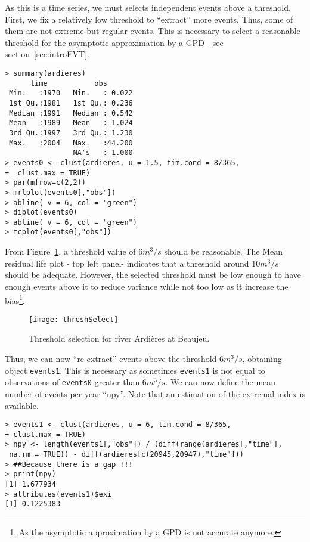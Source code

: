 \documentclass[11pt,a4paper]{article}
\numberwithin{equation}{section}
\theoremstyle{definition}
\begin{document}
As this is a time series, we must selects independent events above a
threshold. First, we fix a relatively low threshold to ``extract''
more events. Thus, some of them are not extreme but regular
events. This is necessary to select a reasonable threshold for the
asymptotic approximation by a GPD - see section~\ref{sec:introEVT}.
\begin{verbatim}
> summary(ardieres)
      time           obs        
 Min.   :1970   Min.   : 0.022  
 1st Qu.:1981   1st Qu.: 0.236  
 Median :1991   Median : 0.542  
 Mean   :1989   Mean   : 1.024  
 3rd Qu.:1997   3rd Qu.: 1.230  
 Max.   :2004   Max.   :44.200  
                NA's   : 1.000  
> events0 <- clust(ardieres, u = 1.5, tim.cond = 8/365,
+  clust.max = TRUE)
> par(mfrow=c(2,2))
> mrlplot(events0[,"obs"])
> abline( v = 6, col = "green")
> diplot(events0)
> abline( v = 6, col = "green")
> tcplot(events0[,"obs"])
\end{verbatim}
From Figure~\ref{fig:threshSelect}, a threshold value of $6 m^3/s$
should be reasonable. The Mean residual life plot - top left panel-
indicates that a threshold around $10 m^3/s$ should be
adequate. However, the selected threshold must be low enough to have
enough events above it to reduce variance while not too low as it
increase the bias\footnote{As the asymptotic approximation by a GPD is
  not accurate anymore.}.

\begin{figure}
  \centering
  \texttt{[image: threshSelect]}
  \caption{Threshold selection for river Ardi\`eres at Beaujeu.}
  \label{fig:threshSelect}
\end{figure}

Thus, we can now ``re-extract'' events above the threshold $6 m^3/s$,
obtaining object \verb|events1|. This is necessary as sometimes
\verb|events1| is not equal to observations of \verb|events0| greater
than $6 m^3/s$. We can now define the mean number of events per year
``npy''. Note that an estimation of the extremal index is available.
\begin{verbatim}
> events1 <- clust(ardieres, u = 6, tim.cond = 8/365,
+ clust.max = TRUE)
> npy <- length(events1[,"obs"]) / (diff(range(ardieres[,"time"],
 na.rm = TRUE)) - diff(ardieres[c(20945,20947),"time"]))
> ##Because there is a gap !!!
> print(npy)
[1] 1.677934
> attributes(events1)$exi
[1] 0.1225383
\end{verbatim}
\end{document}
